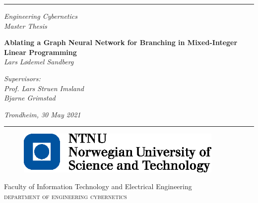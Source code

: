 \pagestyle{empty}
\newcommand{\HRule}{\rule{\linewidth}{1mm}}
 
\vspace*{-3.5cm}
\noindent\HRule
\begin{center}
 
\end{center}
\begin{center}
  \huge
	\large
	\noindent\emph{Engineering Cybernetics\\Master Thesis}
\end{center}
\begin{center}
 
\end{center}
\begin{center}
	\huge
	\noindent\emph{}
  \huge
  \Large
  \noindent \textbf{Ablating a Graph Neural Network for Branching in Mixed-Integer Linear Programming}
  \\ [7mm]
  \large
  \noindent\emph{Lars Lødemel Sandberg }
\end{center}
\begin{center}
  \huge
  \large
  \noindent\emph{Supervisors:\\ Prof. Lars Struen Imsland \\ Bjarne Grimstad}
\end{center}
\begin{center}
	\large
	\noindent \emph{Trondheim, 30 May 2021}
\end{center}
\noindent\HRule
{}
\begin{figure}[h]
	\begin{center}
		\includegraphics[angle=0, width=10cm]{img/logo_ntnu}
	\end{center}
	\label{fig:logo}
\end{figure}
 
\begin{minipage}[c]{\textwidth}
	{\setlength{\baselineskip}{0.5\baselineskip}
	\small \noindent Faculty of Information Technology and Electrical Engineering\\
	\Large \noindent \textsc{department of engineering cybernetics}}
\end{minipage}
